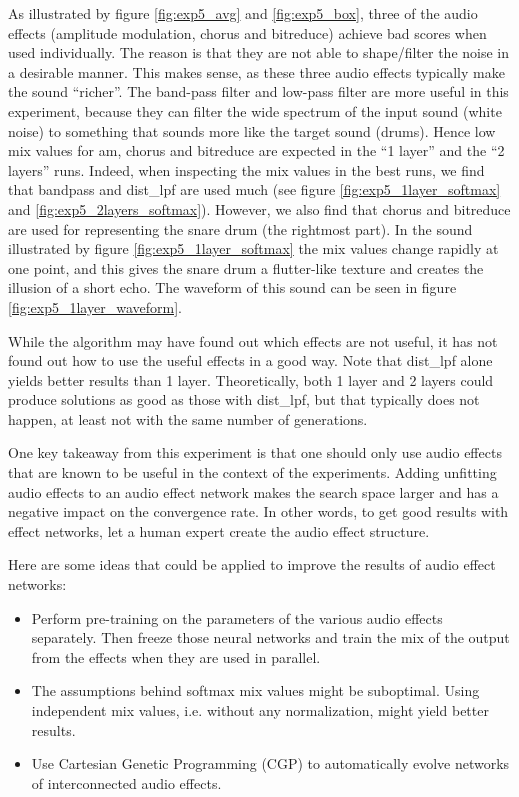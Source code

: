 As illustrated by figure \ref{fig:exp5_avg} and \ref{fig:exp5_box}, three of the audio effects (amplitude modulation, chorus and bitreduce) achieve bad scores when used individually. The reason is that they are not able to shape/filter the noise in a desirable manner. This makes sense, as these three audio effects typically make the sound ``richer''. The band-pass filter and low-pass filter are more useful in this experiment, because they can filter the wide spectrum of the input sound (white noise) to something that sounds more like the target sound (drums). Hence low mix values for am, chorus and bitreduce are expected in the ``1 layer'' and the ``2 layers'' runs. Indeed, when inspecting the mix values in the best runs, we find that bandpass and dist\_lpf are used much (see figure \ref{fig:exp5_1layer_softmax} and \ref{fig:exp5_2layers_softmax}). However, we also find that chorus and bitreduce are used for representing the snare drum (the rightmost part). In the sound illustrated by figure \ref{fig:exp5_1layer_softmax} the mix values change rapidly at one point, and this gives the snare drum a flutter-like texture and creates the illusion of a short echo. The waveform of this sound can be seen in figure \ref{fig:exp5_1layer_waveform}.

While the algorithm may have found out which effects are not useful, it has not found out how to use the useful effects in a good way. Note that dist\_lpf alone yields better results than 1 layer. Theoretically, both 1 layer and 2 layers could produce solutions as good as those with dist\_lpf, but that typically does not happen, at least not with the same number of generations.

One key takeaway from this experiment is that one should only use audio effects that are known to be useful in the context of the experiments. Adding unfitting audio effects to an audio effect network makes the search space larger and has a negative impact on the convergence rate. In other words, to get good results with effect networks, let a human expert create the audio effect structure.

Here are some ideas that could be applied to improve the results of audio effect networks:

\begin{itemize}
\item Perform pre-training on the parameters of the various audio effects separately. Then freeze those neural networks and train the mix of the output from the effects when they are used in parallel.
\item The assumptions behind softmax mix values might be suboptimal. Using independent mix values, i.e. without any normalization, might yield better results.
\item Use Cartesian Genetic Programming (CGP) to automatically evolve networks of interconnected audio effects.
\end{itemize}

